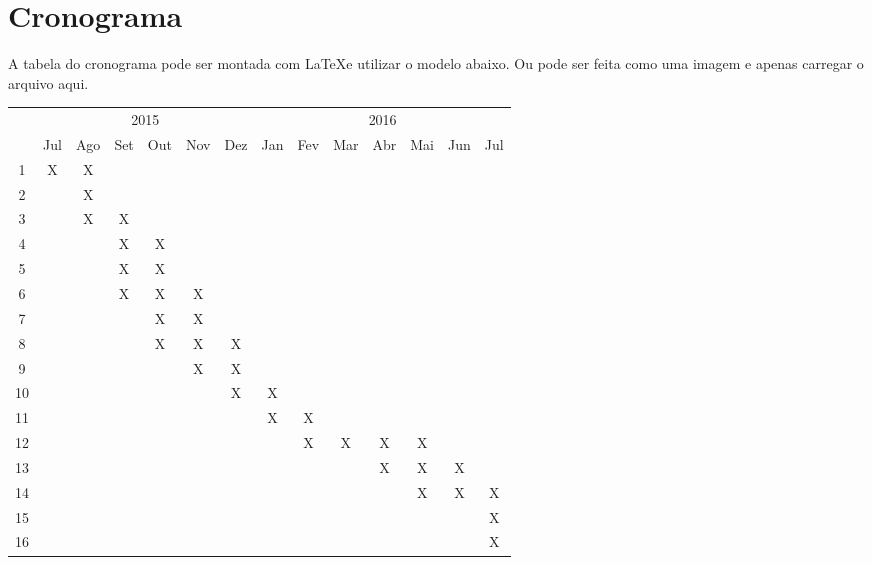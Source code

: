 \documentclass[propostatc,showlinks]{unisc}    %
\begin{document}
\chapter*{Cronograma}

A tabela do cronograma pode ser montada com \LaTeX e utilizar o modelo abaixo. Ou pode ser feita como uma imagem e apenas carregar o arquivo aqui.

\begin{table}[H]
  \label{tab:cronograma}
  \centering
  \begin{tabular}{c|c|c|c|c|c|c|c|c|c|c|c|c|c|}
    \cline{2-14} & \multicolumn{6}{c|}{2015} & \multicolumn{7}{c|}{2016} \\
    \cline{2-14} & Jul & Ago & Set & Out & Nov & Dez & Jan & Fev & Mar & Abr & Mai & Jun & Jul \\
    \cline{1-14} \multicolumn{1}{|c|}{1}  & X & X &   &   &   &   &   &   &   &   &   &   &   \\
    \cline{1-14} \multicolumn{1}{|c|}{2}  &   & X &   &   &   &   &   &   &   &   &   &   &   \\
    \cline{1-14} \multicolumn{1}{|c|}{3}  &   & X & X &   &   &   &   &   &   &   &   &   &   \\
    \cline{1-14} \multicolumn{1}{|c|}{4}  &   &   & X & X &   &   &   &   &   &   &   &   &   \\
    \cline{1-14} \multicolumn{1}{|c|}{5}  &   &   & X & X &   &   &   &   &   &   &   &   &   \\
    \cline{1-14} \multicolumn{1}{|c|}{6}  &   &   & X & X & X &   &   &   &   &   &   &   &   \\
    \cline{1-14} \multicolumn{1}{|c|}{7}  &   &   &   & X & X &   &   &   &   &   &   &   &   \\
    \cline{1-14} \multicolumn{1}{|c|}{8}  &   &   &   & X & X & X &   &   &   &   &   &   &   \\
    \cline{1-14} \multicolumn{1}{|c|}{9}  &   &   &   &   & X & X &   &   &   &   &   &   &   \\
    \cline{1-14} \multicolumn{1}{|c|}{10} &   &   &   &   &   & X & X &   &   &   &   &   &   \\
    \cline{1-14} \multicolumn{1}{|c|}{11} &   &   &   &   &   &   & X & X &   &   &   &   &   \\
    \cline{1-14} \multicolumn{1}{|c|}{12} &   &   &   &   &   &   &   & X & X & X & X &   &   \\
    \cline{1-14} \multicolumn{1}{|c|}{13} &   &   &   &   &   &   &   &   &   & X & X & X &   \\
    \cline{1-14} \multicolumn{1}{|c|}{14} &   &   &   &   &   &   &   &   &   &   & X & X & X \\
    \cline{1-14} \multicolumn{1}{|c|}{15} &   &   &   &   &   &   &   &   &   &   &   &   & X \\
    \cline{1-14} \multicolumn{1}{|c|}{16} &   &   &   &   &   &   &   &   &   &   &   &   & X \\
    \cline{1-14}
  \end{tabular}
\end{table}




\makesignature
\end{document}
